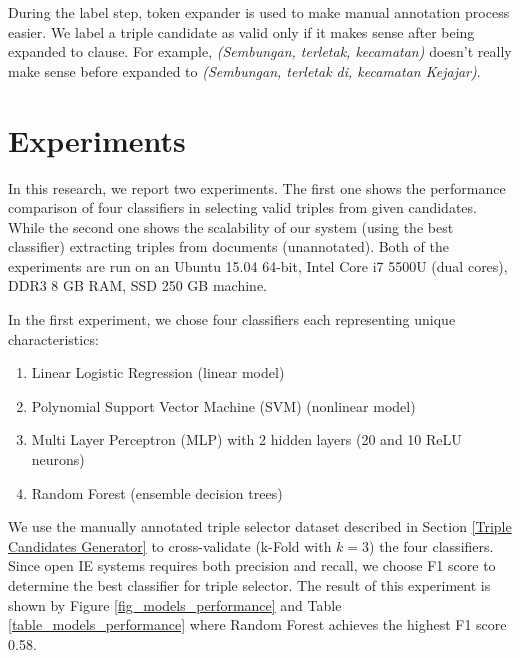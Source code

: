 \documentclass[conference,compsoc,12pt]{IEEEtran}
\begin{document}
During the label step, token expander is used to make manual annotation process easier. We label a triple candidate as valid only if it makes sense after being expanded to clause. For example, \textit{(Sembungan, terletak, kecamatan)} doesn't really make sense before expanded to \textit{(Sembungan, terletak di, kecamatan Kejajar)}.

\section{Experiments} \label{Experiments}

In this research, we report two experiments. The first one shows the performance comparison of four classifiers in selecting valid triples from given candidates. While the second one shows the scalability of our system (using the best classifier) extracting triples from documents (unannotated). Both of the experiments are run on an Ubuntu 15.04 64-bit, Intel Core i7 5500U (dual cores), DDR3 8 GB RAM, SSD 250 GB machine.

In the first experiment, we chose four classifiers each representing unique characteristics: 

\begin{enumerate}
\item Linear Logistic Regression\cite{fan2008liblinear} (linear model)
\item Polynomial Support Vector Machine (SVM)\cite{chang2011libsvm} (nonlinear model)
\item Multi Layer Perceptron (MLP)\cite{hinton1989connectionist} with 2 hidden layers (20 and 10 ReLU\cite{nair2010rectified} neurons)
\item Random Forest\cite{wasserman2015grid} (ensemble decision trees)
\end{enumerate}
  
We use the manually annotated triple selector dataset described in Section \ref{Triple Candidates Generator} to cross-validate\cite{kohavi1995study} (k-Fold with $k=3$) the four classifiers. Since open IE systems requires both precision and recall\cite{angeli2015leveraging}, we choose F1 score to determine the best classifier for triple selector. The result of this experiment is shown by Figure \ref{fig_models_performance} and Table \ref{table_models_performance} where Random Forest achieves the highest F1 score 0.58.
\end{document}
